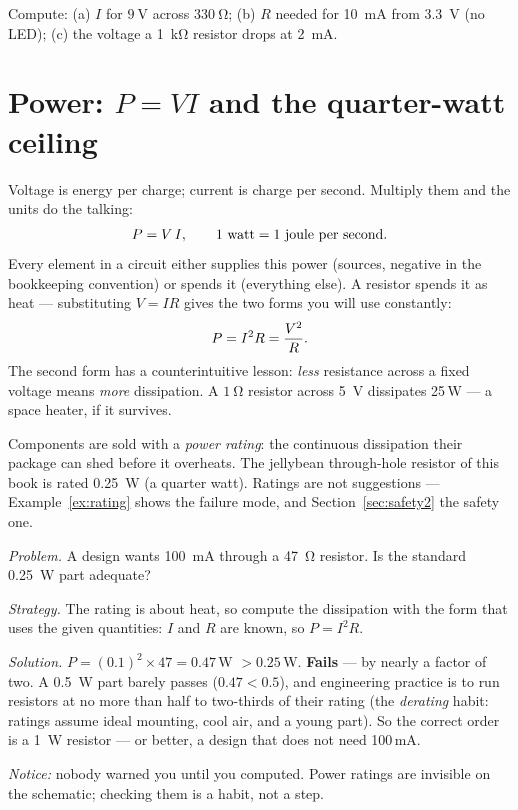 \begin{exercise}[easy]
Compute: (a) $I$ for $\qty{9}{\volt}$ across $\qty{330}{\ohm}$;
(b) $R$ needed for \qty{10}{\milli\ampere} from \qty{3.3}{\volt} (no LED);
(c) the voltage a \qty{1}{\kilo\ohm} resistor drops at \qty{2}{\milli\ampere}.
\end{exercise}

\section{Power: $P=VI$ and the quarter-watt ceiling}
\label{sec:power}

Voltage is energy per charge; current is charge per second. Multiply them
and the units do the talking:
\[
  P = V\,I, \qquad \text{1 watt} = \text{1 joule per second}.
  \index{power|textbf}\index{watt}
\]
Every element in a circuit either supplies this power (sources, negative in
the bookkeeping convention) or spends it (everything else). A resistor spends
it as heat — substituting $V=IR$ gives the two forms you will use constantly:
\[
  P = I^2 R = \frac{V^2}{R}. \index{power!dissipation}
\]
The second form has a counterintuitive lesson: \emph{less} resistance across a
fixed voltage means \emph{more} dissipation. A $\qty{1}{\ohm}$ resistor across
\qty{5}{\volt} dissipates 25\,W — a space heater, if it survives.

Components are sold with a \emph{power rating}: the
continuous dissipation their package can shed before it overheats. The
jellybean through-hole resistor of this book is rated
\qty{0.25}{\watt} (a quarter watt). Ratings are not suggestions —
Example~\ref{ex:rating} shows the failure mode, and Section~\ref{sec:safety2}
the safety one.

\begin{example}
\label{ex:rating}
\emph{Problem.} A design wants \qty{100}{\milli\ampere} through a
\qty{47}{\ohm} resistor. Is the standard \qty{0.25}{\watt} part
adequate?\par
\emph{Strategy.} The rating is about heat, so compute the dissipation with the
form that uses the given quantities: $I$ and $R$ are known, so $P=I^2R$.\par
\emph{Solution.} $P = (0.1)^2 \times 47 = 0.47$\,W $> 0.25$\,W. \textbf{Fails}
— by nearly a factor of two. A \qty{0.5}{\watt} part barely passes
($0.47 < 0.5$), and engineering practice is to run resistors at no more than
half to two-thirds of their rating (the \emph{derating}
habit: ratings assume ideal mounting, cool air, and a young part). So the
correct order is a \qty{1}{\watt} resistor — or better, a design that does not
need 100\,mA.\par
\emph{Notice:} nobody warned you until you computed. Power ratings are
invisible on the schematic; checking them is a habit, not a step.
\end{example}

